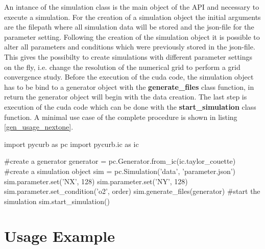 An intance of the simulation class is the main object of the API and
necessary to execute a simulation. For the creation of a simulation object
the initial arguments are the filepath where all simulation data will be stored
and the json-file for the parameter setting.
Following the creation of the simulation object it is possible to alter all parameters and conditions
which were previously stored in the json-file. This gives the possibilty to create
simulations with different parameter settings on the fly, i.e. change the resolution of the numerical grid
to perform a grid convergence study.
Before the execution of the cuda code, the simulation object has to be bind to a generator object
with the \textbf{generate\_files} class function, in return the generator object will begin
with the data creation. The last step is execution of the cuda code which can be done with the \textbf{start\_simulation}
class function.  A minimal use case of the complete procedure is shown in listing \ref{gen_usage_nextone}.

\clearpage

\begin{python}[caption='Simulation class usage', label={gen_usage_nextone}]
import pycurb as pc
import pycurb.ic as ic

#create a generator
generator = pc.Generator.from_ic(ic.taylor_couette)
#create a simulation object
sim = pc.Simulation('data', 'parameter.json')
sim.parameter.set('NX', 128)
sim.parameter.set('NY', 128)
sim.parameter.set_condition('o2', order)
sim.generate_files(generator)
#start the simulation
sim.start_simulation()
\end{python}

\section{Usage Example}

